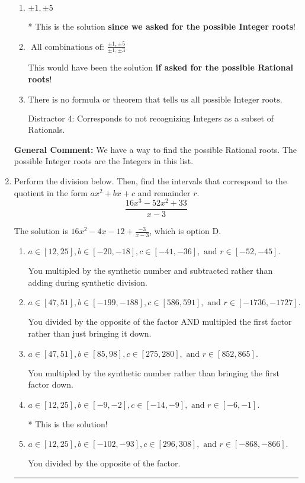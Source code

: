 \documentclass{extbook}[14pt]
\newcommand{\litem}[1]{\item #1

\rule{\textwidth}{0.4pt}}
\begin{document}
\begin{enumerate}
{\begin{enumerate}[label=\Alph*.]
 Distractor 3: Corresponds to the plus or minus of the inverse quotient (an/a0) of the factors. 
\item \( \pm 1,\pm 5 \)

* This is the solution \textbf{since we asked for the possible Integer roots}!
\item \( \text{ All combinations of: }\frac{\pm 1,\pm 5}{\pm 1,\pm 3} \)

This would have been the solution \textbf{if asked for the possible Rational roots}!
\item \( \text{There is no formula or theorem that tells us all possible Integer roots.} \)

 Distractor 4: Corresponds to not recognizing Integers as a subset of Rationals.
\end{enumerate}

\textbf{General Comment:} We have a way to find the possible Rational roots. The possible Integer roots are the Integers in this list.
}
\litem{
Perform the division below. Then, find the intervals that correspond to the quotient in the form $ax^2+bx+c$ and remainder $r$.
\[ \frac{16x^{3} -52 x^{2} + 33}{x -3} \]

The solution is \( 16x^{2} -4 x -12 + \frac{-3}{x -3} \), which is option D.\begin{enumerate}[label=\Alph*.]
\item \( a \in [12, 25], b \in [-20, -18], c \in [-41, -36], \text{ and } r \in [-52, -45]. \)

 You multipled by the synthetic number and subtracted rather than adding during synthetic division.
\item \( a \in [47, 51], b \in [-199, -188], c \in [586, 591], \text{ and } r \in [-1736, -1727]. \)

 You divided by the opposite of the factor AND multipled the first factor rather than just bringing it down.
\item \( a \in [47, 51], b \in [85, 98], c \in [275, 280], \text{ and } r \in [852, 865]. \)

 You multipled by the synthetic number rather than bringing the first factor down.
\item \( a \in [12, 25], b \in [-9, -2], c \in [-14, -9], \text{ and } r \in [-6, -1]. \)

* This is the solution!
\item \( a \in [12, 25], b \in [-102, -93], c \in [296, 308], \text{ and } r \in [-868, -866]. \)

 You divided by the opposite of the factor.
\end{enumerate}

}
\end{enumerate}
\end{document}
